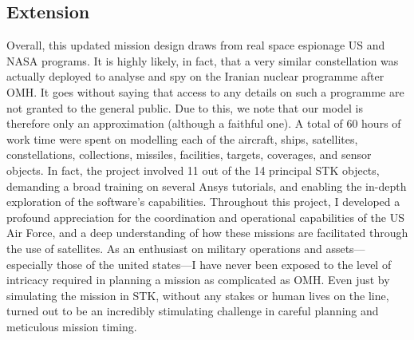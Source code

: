 \documentclass{article}
\newif\ifpartB
\begin{document}
\subsection{Extension}
Overall, this updated mission design draws from real space espionage US and NASA programs. It is highly likely, in fact, that a very similar constellation was actually deployed to analyse and spy on the Iranian nuclear programme after OMH. It goes without saying that access to any details on such a programme are not granted to the general public. Due to this, we note that our model is therefore only an approximation (although a faithful one). A total of 60 hours of work time were spent on modelling each of the aircraft, ships, satellites, constellations, collections, missiles, facilities, targets, coverages, and sensor objects. In fact, the project involved 11 out of the 14 principal STK objects, demanding a broad training on several Ansys tutorials, and enabling the in-depth exploration of the software's capabilities. 
\fi
Throughout this project, I developed a profound appreciation for the coordination and operational capabilities of the US Air Force, and a deep understanding of how these missions are facilitated through the use of satellites. As an enthusiast on military operations and assets---especially those of the united states---I have never been exposed to the level of intricacy required in planning a mission as complicated as OMH. Even just by simulating the mission in STK, without any stakes or human lives on the line, turned out to be an incredibly stimulating challenge in careful planning and meticulous mission timing.
\ifpartB
Furthermore, the extension involving the HammerEye constellation, which solidified the mission's main objective by providing extensive coverage and intelligence over the struck nuclear sites, enriched my respect for planning out the deployment of satellite constellations and pushed me to explore an even broader range of STK tools and objects. I have really enjoyed working on this project, and personally (as an Oxford student on my first semester at Princeton) this project has represented the most stimulating and compelling assignment in my undergraduate career.
\fi

\clearpage
\printbibliography
\end{document}
